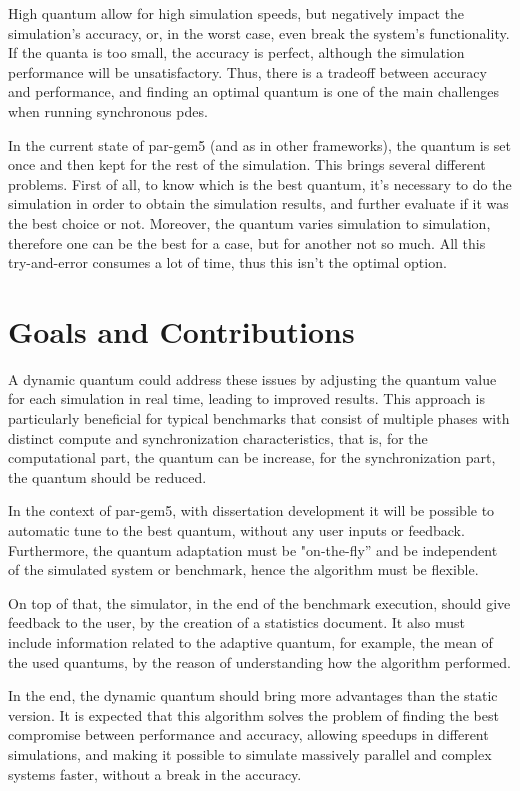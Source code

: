 High quantum allow for high simulation speeds, but negatively impact the simulation’s accuracy, or, in the worst case, even break the system’s functionality. If the quanta is too small, the accuracy is perfect, although the simulation performance will be unsatisfactory. Thus, there is a tradeoff between accuracy and performance, and finding an optimal quantum is one of the main challenges when running synchronous \gls{pdes}.

In the current state of par-gem5 (and as in other frameworks), the quantum is set once and then kept for the rest of the simulation. This brings several different problems. First of all, to know which is the best quantum, it's necessary to do the simulation in order to obtain the simulation results, and further evaluate if it was the best choice or not. Moreover, the quantum varies simulation to simulation, therefore one can be the best for a case, but for another not so much. All this try-and-error consumes a lot of time, thus this isn't the optimal option. 

\section{Goals and Contributions}

A dynamic quantum could address these issues by adjusting the quantum value for each simulation in real time, leading to improved results. This approach is particularly beneficial for typical benchmarks that consist of multiple phases with distinct compute and synchronization characteristics, that is, for the computational part, the quantum can be increase, for the synchronization part, the quantum should be reduced. 

In the context of par-gem5, with dissertation development it will be possible to automatic tune to the best quantum, without any user inputs or feedback. Furthermore, the quantum adaptation must be "on-the-fly” and be independent of the simulated system or benchmark, hence the algorithm must be flexible. 

On top of that, the simulator, in the end of the benchmark execution, should give feedback to the user, by the creation of a statistics document. It also must include information related to the adaptive quantum, for example, the mean of the used quantums, by the reason of understanding how the algorithm performed.

 In the end, the dynamic quantum should bring more advantages than the static version. It is expected that this algorithm solves the problem of finding the best compromise between performance and accuracy, allowing speedups in different simulations, and making it possible to simulate massively parallel and complex systems faster, without a break in the accuracy. 

